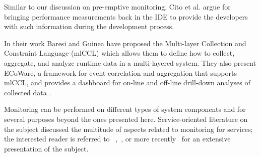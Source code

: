 Similar to our discussion on pre-emptive monitoring, Cito et al. \cite{cito2015runtime} argue for bringing performance measurements back in the IDE to provide the developers with such information during the development process.

In their work Baresi and Guinea have proposed the Multi-layer Collection and Constraint Language (mlCCL) which allows them to define how to collect, aggregate, and analyze runtime data in a multi-layered system. They also present ECoWare, a framework for event correlation and aggregation that supports mlCCL, and provides a dashboard for on-line and off-line drill-down analyses of collected data \cite{Bare13-monitoring}.

Monitoring can be performed on different types of system components and for several purposes beyond the ones presented here. Service-oriented literature on the subject discussed the multitude of aspects related to monitoring for services; the interested reader is referred to ~\cite{ghezzi2007run},~\cite{metzger2010analytical}, or more recently~\cite{pernici2016monitoring} for an extensive presentation of the subject. 





